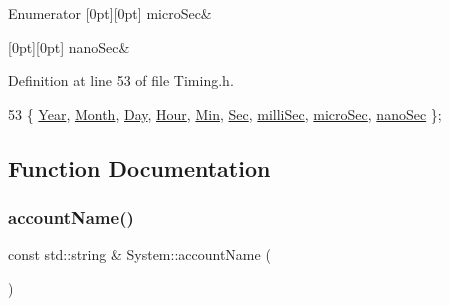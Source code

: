 \begin{DoxyEnumFields}{Enumerator}
[0pt][0pt]{}\mbox{\label{namespaceSystem_a15db094516c062b412df2453b4350f1aac1b8171b8958dbf619ac6e53eea30ee8}} 
micro\+Sec&\\
\hline

[0pt][0pt]{}\mbox{\label{namespaceSystem_a15db094516c062b412df2453b4350f1aa6f2f428d84545df4ed7b5b9022ed7e23}} 
nano\+Sec&\\
\hline

\end{DoxyEnumFields}


Definition at line 53 of file Timing.\+h.


\begin{DoxyCode}
53 \{ \hyperlink{namespaceSystem_a15db094516c062b412df2453b4350f1aa64832eae7c2445025f46f1edffee0dc9}{Year}, \hyperlink{namespaceSystem_a15db094516c062b412df2453b4350f1aa9cb8038eade78dc7e9eea70e011bf486}{Month}, \hyperlink{namespaceSystem_a15db094516c062b412df2453b4350f1aadfe8009835ec554da788b9f760d87b70}{Day}, \hyperlink{namespaceSystem_a15db094516c062b412df2453b4350f1aa7892c9d3e6ae2e92369991add3309b7f}{Hour}, \hyperlink{namespaceSystem_a15db094516c062b412df2453b4350f1aa586582933928c3e070299d678e0e2b64}{Min}, \hyperlink{namespaceSystem_a15db094516c062b412df2453b4350f1aa6d191428f7f4db75520ed5e52a6951ea}{Sec}, \hyperlink{namespaceSystem_a15db094516c062b412df2453b4350f1aa1b7bae23a29567151c8b8103104c620a}{milliSec}, 
      \hyperlink{namespaceSystem_a15db094516c062b412df2453b4350f1aac1b8171b8958dbf619ac6e53eea30ee8}{microSec}, \hyperlink{namespaceSystem_a15db094516c062b412df2453b4350f1aa6f2f428d84545df4ed7b5b9022ed7e23}{nanoSec} \};
\end{DoxyCode}


\subsection{Function Documentation}
\mbox{\label{namespaceSystem_a8a4ea73b74e0f6b8225e571e21ba4e2f}} 
\subsubsection{\texorpdfstring{account\+Name()}{accountName()}}
{\footnotesize\ttfamily const std\+::string \& System\+::account\+Name (\begin{DoxyParamCaption}{ }\end{DoxyParamCaption})}



